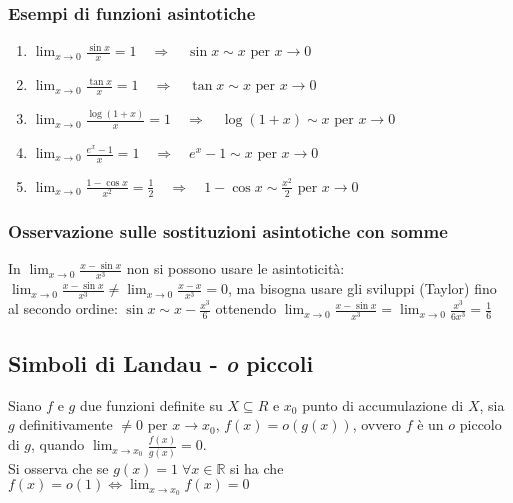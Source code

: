 \documentclass[a4paper]{article}
\begin{document}
\subsubsection*{Esempi di funzioni asintotiche}
\begin{enumerate}
	\item \(\displaystyle \lim_{x \to 0} \frac{\sin x}{x} = 1 \quad \Rightarrow \quad \sin x \sim x \text{ per } x \to 0\)
	\item \(\displaystyle \lim_{x \to 0} \frac{\tan x}{x} = 1 \quad \Rightarrow \quad \tan x \sim x \text{ per } x \to 0\)
	\item \(\displaystyle \lim_{x \to 0} \frac{\log (1 + x)}{x} = 1 \quad \Rightarrow \quad \log (1 + x) \sim x \text{ per } x \to 0\)
	\item \(\displaystyle \lim_{x \to 0} \frac{e ^ x - 1}{x} = 1 \quad \Rightarrow \quad e ^ x - 1 \sim x \text{ per } x \to 0\)
	\item \(\displaystyle \lim_{x \to 0} \frac{1 - \cos x}{x^2} = \frac{1}{2} \quad \Rightarrow \quad 1 - \cos x \sim \frac{x^2}{2} \text{ per } x \to 0\)
\end{enumerate}

\subsubsection*{Osservazione sulle sostituzioni asintotiche con somme}
In \(\displaystyle \lim_{x \to 0} \frac{x-\sin x}{x^3}\) non si possono usare le asintoticità: \(\displaystyle \lim_{x \to 0} \frac{x - \sin x}{x^3} \neq \lim_{x \to 0} \frac{x - x}{x^3} = 0\),
ma bisogna usare gli sviluppi (Taylor) fino al secondo ordine: \(\displaystyle \sin x \sim x - \frac{x^3}{6}\) ottenendo \(\displaystyle \lim_{x \to 0} \frac{x - \sin x}{x^3} = \lim_{x \to 0} \frac{x^3}{6x^3} = \frac{1}{6}\)

\newpage

\subsection{Simboli di Landau - \textit{o} piccoli}
Siano \(f\) e \(g\) due funzioni definite su \(X \subseteq R\) e \(x_0\) punto di accumulazione di \(X\), sia \(g\) definitivamente \(\neq 0\) per \(x \to x_0\),
\(f(x) = o(g(x))\), ovvero \(f\) è un \(o\) piccolo di \(g\), quando \(\displaystyle \lim_{x \to x_0} \frac{f(x)}{g(x)} = 0\). \\
Si osserva che se \(g(x) = 1 \; \forall x \in \mathbb{R}\) si ha che \(f(x) = o(1) \Leftrightarrow \displaystyle \lim_{x \to x_0} f(x) = 0\)
\end{document}
